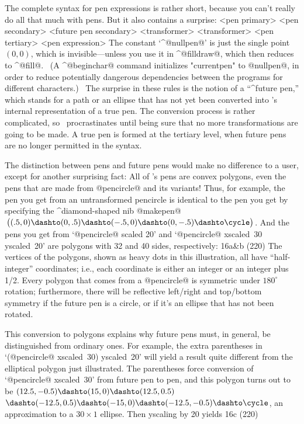 {{{{\danger The complete syntax for pen expressions is rather short, because
you can't really do all that much with pens. But it also contains a
surprise:
\beginsyntax
<pen primary>
 \is[pencircle]
<pen secondary>
<future pen secondary>
 <transformer>
 <transformer>
<pen tertiary>
<pen expression>
\endsyntax
The constant `^@nullpen@' is just the single point $(0,0)$, which is
invisible---unless you use it in ^@filldraw@, which then reduces to
^@fill@. \ (A ^@beginchar@ command initializes "currentpen" to @nullpen@,
in order to reduce potentially dangerous dependencies between the programs
for different characters.) \
The surprise in these rules is the notion of a ``^{future pen},''
which stands for a path or an ellipse that has not yet been converted
into \MF's internal representation of a true pen. The conversion process
is rather complicated, so \MF\ procrastinates until being sure that no
more transformations are going to be made. A true pen is formed at the
tertiary level, when future pens are no longer permitted in the syntax.

\danger The distinction between pens and future pens would make no
difference to a user, except for another surprising fact: All of \MF's
pens are convex polygons, even the pens that are made from @pencircle@
and its variants! Thus, for example, the pen you get from an
untransformed pencircle is identical to the pen you get by specifying
the ^{diamond-shaped nib}
\begindisplay
@makepen@$\,\bigl((.5,0)\dashto(0,.5)\dashto(-.5,0)\dashto
 (0,-.5)\dashto\cycle\bigr)$.
\enddisplay
And the pens you get from `@pencircle@ scaled 20' and `@pencircle@
xscaled~30 yscaled~20' are polygons with 32 and 40 sides, respectively:
\displayfig 16a\&b (220\apspix)
The vertices of the polygons, shown as heavy dots in this illustration,
all have ``half-integer'' coordinates; i.e., each coordinate is either
an integer or an integer plus 1/2. Every polygon that comes from a
@pencircle@ is symmetric under $180^\circ$ rotation; furthermore,
there will be reflective left/right and top/bottom symmetry if the future
pen is a circle, or if it's an ellipse that has not been rotated.

\danger This conversion to polygons explains why future pens must, in
general, be distinguished from ordinary ones. For example, the extra
parentheses in `(@pencircle@ xscaled~30) yscaled~20' will yield
a result quite different from the elliptical polygon just illustrated.
The parentheses force conversion of `@pencircle@ xscaled~30' from
future pen to pen, and this polygon turns out to be
\begindisplay
$(12.5,-0.5) \dashto (15,0) \dashto (12.5,0.5)$\cr
\qquad$\dashto (-12.5,0.5) \dashto
(-15,0) \dashto (-12.5,-0.5) \dashto\cycle$,\cr
\enddisplay
an approximation to a $30\times1$ ellipse. Then yscaling by 20 yields
\displayfig 16c (220\apspix)

}}}}
